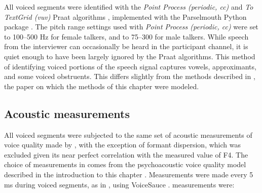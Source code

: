 All voiced segments were identified with the \textit{Point Process (periodic, cc)} and \textit{To TextGrid (vuv)} Praat algorithms \citep{boersma_2021_praat}, implemented with the Parselmouth Python package \citep{jadoul_2018_parselmouth}. The pitch range settings used with \textit{Point Process (periodic, cc)} were set to 100--500 Hz for female talkers, and to 75--300 for male talkers. While speech from the interviewer can occasionally be heard in the participant channel, it is quiet enough to have been largely ignored by the Praat algorithms. This method of identifying voiced portions of the speech signal captures vowels, approximants, and some voiced obstruents. This differs slightly from the methods described in \citet{lee_2019_acoustic-paper}, the paper on which the methods of this chapter were modeled. 

\subsection{Acoustic measurements}\label{ch3:sec:acoustic}
All voiced segments were subjected to the same set of acoustic measurements of voice quality made by \citet{lee_2019_acoustic-paper}, with the exception of formant dispersion, which was excluded given its near perfect correlation with the measured value of F4. The choice of measurements in \citet{lee_2019_acoustic-paper} comes from the psychoacoustic voice quality model described in the introduction to this chapter \citep{kreiman_2014_theory}. Measurements were made every 5 ms during voiced segments, as in \citet{lee_2019_acoustic-paper}, using VoiceSauce \citep{shue_2011_voicesauce}.  measurements were: 

